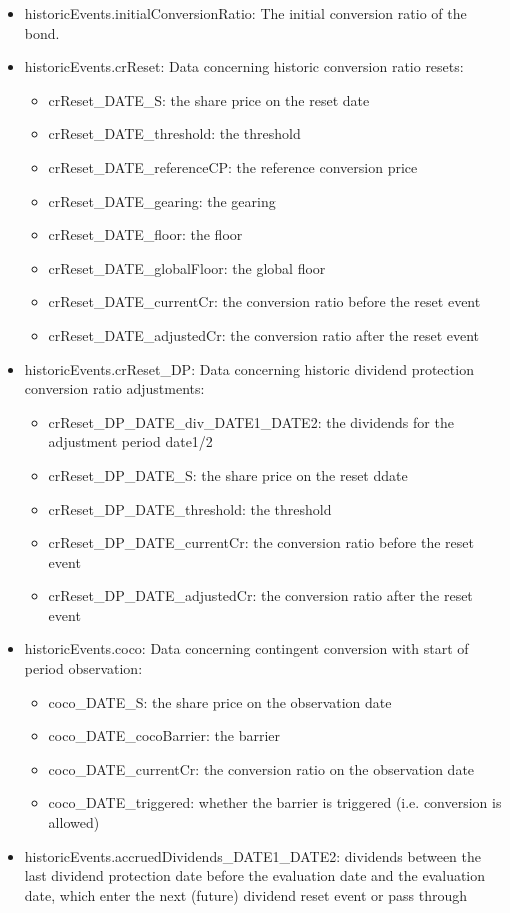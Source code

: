 \begin{itemize}
\item historicEvents.initialConversionRatio: The initial conversion ratio of the bond.
\item historicEvents.crReset: Data concerning historic conversion ratio resets:
  \begin{itemize}
  \item crReset\_DATE\_S: the share price on the reset date
  \item crReset\_DATE\_threshold: the threshold
  \item crReset\_DATE\_referenceCP: the reference conversion price
  \item crReset\_DATE\_gearing: the gearing
  \item crReset\_DATE\_floor: the floor
  \item crReset\_DATE\_globalFloor: the global floor
  \item crReset\_DATE\_currentCr: the conversion ratio before the reset event
  \item crReset\_DATE\_adjustedCr: the conversion ratio after the reset event
  \end{itemize}
\item historicEvents.crReset\_DP: Data concerning historic dividend protection conversion ratio adjustments:
  \begin{itemize}
  \item crReset\_DP\_DATE\_div\_DATE1\_DATE2: the dividends for the adjustment period date1/2
  \item crReset\_DP\_DATE\_S: the share price on the reset ddate
  \item crReset\_DP\_DATE\_threshold: the threshold
  \item crReset\_DP\_DATE\_currentCr: the conversion ratio before the reset event
  \item crReset\_DP\_DATE\_adjustedCr: the conversion ratio after the reset event
  \end{itemize}
\item historicEvents.coco: Data concerning contingent conversion with start of period observation:
  \begin{itemize}
  \item coco\_DATE\_S: the share price on the observation date
  \item coco\_DATE\_cocoBarrier: the barrier
  \item coco\_DATE\_currentCr: the conversion ratio on the observation date
  \item coco\_DATE\_triggered: whether the barrier is triggered (i.e. conversion is allowed)
  \end{itemize}
\item historicEvents.accruedDividends\_DATE1\_DATE2: dividends between the last dividend protection date before the
  evaluation date and the evaluation date, which enter the next (future) dividend reset event or pass through
\end{itemize}

